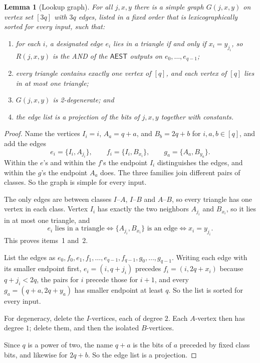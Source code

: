 \documentclass[11pt]{article}
\newtheorem{lemma}[theorem]{Lemma}
\theoremstyle{definition}
\theoremstyle{remark}
\newcommand{\AEST}{\mathsf{AEST}}
\begin{document}
\begin{lemma}[Lookup graph]\label{lem:graph}
For all $j,x,y$ there is a simple graph $G(j,x,y)$ on vertex set $[3q]$
with $3q$ edges, listed in a fixed order that is lexicographically sorted
for every input, such that:
\begin{enumerate}
\item for each $i$, a designated edge $e_i$ lies in a triangle if and only
if $x_i=y_{j_i}$, so $R(j,x,y)$ is the AND of the $\AEST$ outputs on
$e_0,\dots,e_{q-1}$;
\item every triangle contains exactly one vertex of $[q]$, and each vertex
of $[q]$ lies in at most one triangle;
\item $G(j,x,y)$ is 2-degenerate; and
\item the edge list is a projection of the bits of $j,x,y$ together with
constants.
\end{enumerate}
\end{lemma}
\begin{proof}
Name the vertices $I_i=i$, $A_a=q+a$, and $B_b=2q+b$ for $i,a,b\in[q]$,
and add the edges
\[
e_i=\{I_i,A_{j_i}\},\qquad f_i=\{I_i,B_{x_i}\},\qquad g_a=\{A_a,B_{y_a}\}.
\]
Within the $e$'s and within the $f$'s the endpoint $I_i$ distinguishes
the edges, and within the $g$'s the endpoint $A_a$ does. The three families
join different pairs of classes. So the graph is simple for every input.

The only edges are between classes $I$--$A$, $I$--$B$ and $A$--$B$, so
every triangle has one vertex in each class. Vertex $I_i$ has exactly the
two neighbors $A_{j_i}$ and $B_{x_i}$, so it lies in at most one triangle,
and
\[
e_i\text{ lies in a triangle}
\iff\{A_{j_i},B_{x_i}\}\text{ is an edge}
\iff x_i=y_{j_i}.
\]
This proves items~1 and~2.

List the edges as $e_0,f_0,e_1,f_1,\dots,e_{q-1},f_{q-1},g_0,\dots,g_{q-1}$.
Writing each edge with its smaller endpoint first, $e_i=(i,q+j_i)$ precedes
$f_i=(i,2q+x_i)$ because $q+j_i<2q$, the pairs for $i$ precede those for
$i+1$, and every $g_a=(q+a,2q+y_a)$ has smaller endpoint at least $q$. So
the list is sorted for every input.

For degeneracy, delete the $I$-vertices, each of degree $2$. Each
$A$-vertex then has degree $1$; delete them, and then the isolated
$B$-vertices.

Since $q$ is a power of two, the name $q+a$ is the bits of $a$ preceded by
fixed class bits, and likewise for $2q+b$. So the edge list is a projection.
\end{proof}
\end{document}
